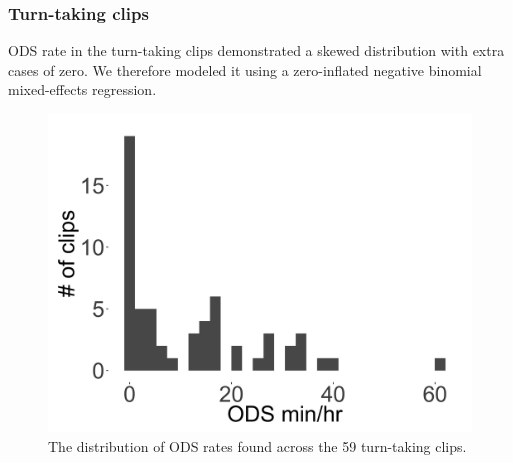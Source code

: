 \documentclass[floatsintext,man]{apa6}
\theoremstyle{definition}
\theoremstyle{definition}
\theoremstyle{definition}
\theoremstyle{remark}
\begin{document}
\FloatBarrier

\subsubsection{Turn-taking clips}\label{models-ods-turntaking}

ODS rate in the turn-taking clips demonstrated a skewed distribution
with extra cases of zero. We therefore modeled it using a zero-inflated
negative binomial mixed-effects regression.

\FloatBarrier

\begin{figure}[H]

{\centering \includegraphics[width=0.4\linewidth]{www/ODS_turntaking_distribution} 

}

\caption{The distribution of ODS rates found across the 59 turn-taking clips.}\label{fig:fig10}
\end{figure}

\FloatBarrier
\end{document}
